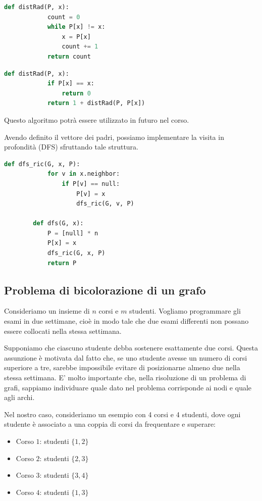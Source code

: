 \documentclass[12pt]{report}
\begin{document}
	\begin{lstlisting}[language=Python, caption={Risoluzione iterativa}]
		def distRad(P, x):
			count = 0
			while P[x] != x:
				x = P[x]
				count += 1
			return count
	\end{lstlisting}
	
	\begin{lstlisting}[language=Python, caption={Risoluzione ricorsiva}]
		def distRad(P, x):
			if P[x] == x:
				return 0
			return 1 + distRad(P, P[x])
	\end{lstlisting}
	
	Questo algoritmo potrà essere utilizzato in futuro nel corso.
	
	Avendo definito il vettore dei padri, possiamo implementare la visita in profondità (DFS) sfruttando tale struttura.
	
	\begin{lstlisting}[style=stile-listings, caption={Algoritmo DFS con vettore dei padri}, language=Python]
		def dfs_ric(G, x, P):
			for v in x.neighbor:
				if P[v] == null:
					P[v] = x
					dfs_ric(G, v, P)
				
		def dfs(G, x):
			P = [null] * n
			P[x] = x
			dfs_ric(G, x, P)
			return P
	\end{lstlisting}
	
	\subsection{Problema di bicolorazione di un grafo}
	Consideriamo un insieme di $n$ corsi e $m$ studenti. Vogliamo programmare gli esami in due settimane, cioè in modo tale che due esami differenti non possano essere collocati nella stessa settimana. 
	
	Supponiamo che ciascuno studente debba sostenere esattamente due corsi. Questa assunzione è motivata dal fatto che, se uno studente avesse un numero di corsi superiore a tre, sarebbe impossibile evitare di posizionarne almeno due nella stessa settimana.
	\smallbreak
	E' molto importante che, nella risoluzione di un problema di grafi, sappiamo individuare quale dato nel problema corrisponde ai nodi e quale agli archi.
	
	Nel nostro caso, consideriamo un esempio con 4 corsi e 4 studenti, dove ogni studente è associato a una coppia di corsi da frequentare e superare:
	
	\begin{itemize}
		\item Corso $1$: studenti $\{1, 2\}$
		\item Corso $2$: studenti $\{2, 3\}$
		\item Corso $3$: studenti $\{3, 4\}$
		\item Corso $4$: studenti $\{1, 3\}$
	\end{itemize}
	
\end{document}
